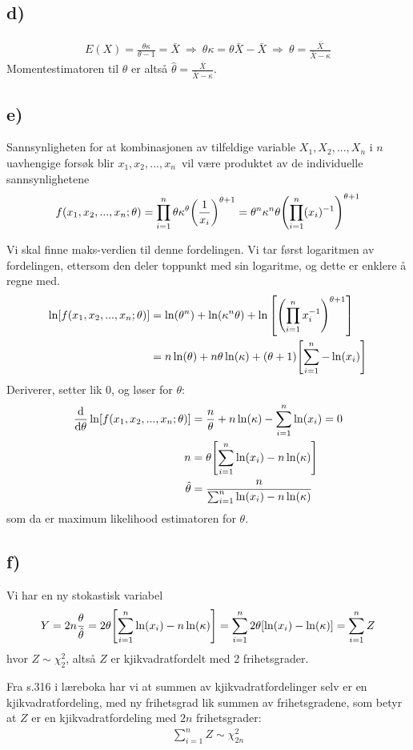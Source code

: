 \documentclass[12p,a4paper]{article}
\begin{document}
\subsection*{d)}
\begin{align*}
    E(X) = \frac{\theta\kappa}{\theta - 1} = \bar{X} \ \Rightarrow \ 
    \theta\kappa = \theta\bar{X} - \bar{X} \ \Rightarrow \ 
    \theta = \frac{\bar{X}}{\bar{X} - \kappa}
\end{align*}
Momentestimatoren til $\theta$ er altså $\hat{\theta} = \frac{\bar{X}}{\bar{X} - \kappa}$.


\subsection*{e)}
Sannsynligheten for at kombinasjonen av tilfeldige variable $X_1, X_2,...,X_n$ i $n$ uavhengige forsøk blir $x_1, x_2,...,x_n$ vil være produktet av de individuelle sannsynlighetene
\begin{align*}
    f(x_1, x_2, ..., x_n; \theta) = \prod_{i=1}^n \theta\kappa^\theta\qty(\frac{1}{x_i})^{\theta+1} = \theta^n\kappa^n\theta \qty(\prod_{i=1}^n (x_i)^{-1})^{\theta+1}
\end{align*}

Vi skal finne maks-verdien til denne fordelingen. Vi tar først logaritmen av fordelingen, ettersom den deler toppunkt med sin logaritme, og dette er enklere å regne med.
\begin{align*}
    \ln[f(x_1, x_2, ..., x_n; \theta)]
    &= \ln(\theta^n) + \ln(\kappa^n\theta) + \ln\qty[\qty(\prod_{i=1}^n x_i^{-1})^{\theta+1}] \\
    &= n\ln(\theta) + n\theta\ln(\kappa) + (\theta + 1)\qty[ \sum_{i=1}^n -\ln(x_i) ]
\end{align*}
Deriverer, setter lik 0, og løser for $\theta$:
\begin{align*}
    \dv{\theta} \ln[f(x_1, x_2, ..., x_n; \theta)] &= \frac{n}{\theta} + n\ln(\kappa) - \sum_{i=1}^n \ln(x_i) = 0 \\
    n &= \theta\qty[\sum_{i=1}^n \ln(x_i) - n\ln(\kappa)] \\
    \hat{\theta} &= \frac{n}{\sum_{i=1}^n \ln(x_i) - n\ln(\kappa)}
\end{align*}
som da er maximum likelihood estimatoren for $\theta$.


\subsection*{f)}
Vi har en ny stokastisk variabel
\begin{align*}
    Y = 2n\frac{\theta}{\hat{\theta}} = 2\theta\qty[\sum_{i=1}^n \ln(x_i) - n\ln(\kappa)] = \sum_{i=1}^n 2\theta\qty[\ln(x_i) - \ln(\kappa)] = \sum_{i=1}^n Z
\end{align*}
hvor $Z \sim \chi_2^2$, altså $Z$ er kjikvadratfordelt med 2 frihetsgrader.

Fra s.316 i læreboka har vi at summen av kjikvadratfordelinger selv er en kjikvadratfordeling, med ny frihetsgrad lik summen av frihetsgradene, som betyr at $Z$ er en kjikvadratfordeling med $2n$ frihetsgrader:
\begin{align*}
    \sum_{i=1}^n Z \sim \chi_{2n}^2
\end{align*}
\end{document}
